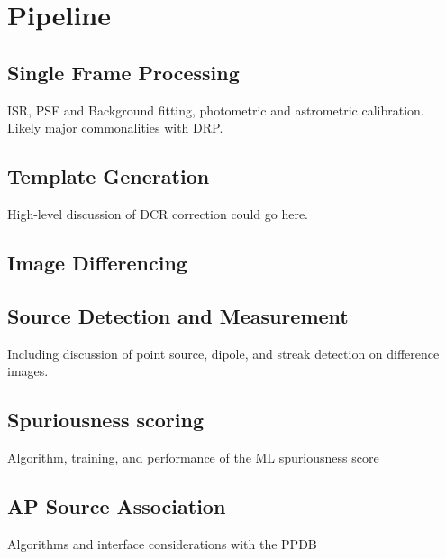 
\section{Pipeline}


\subsection{Single Frame Processing}


ISR, PSF and Background fitting, photometric and astrometric calibration.  Likely major commonalities with DRP.

\subsection{Template Generation}


High-level discussion of DCR correction could go here.

\subsection{Image Differencing}

\subsection{Source Detection and Measurement}

Including discussion of point source, dipole, and streak detection on difference images.  


\subsection{Spuriousness scoring}

Algorithm, training, and performance of the ML spuriousness score

\subsection{AP Source Association}

Algorithms and interface considerations with the PPDB

